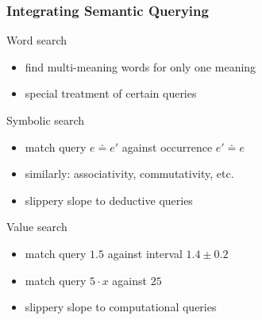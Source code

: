 \begin{frame}\frametitle{Integrating Semantic Querying}
Word search
\begin{itemize}
\item find multi-meaning words for only one meaning 
\item special treatment of certain queries 
\end{itemize}

Symbolic search
\begin{itemize}
\item match query $e\doteq e'$ against occurrence $e'\doteq e$
\item similarly: associativity, commutativity, etc.
\item slippery slope to deductive queries
\end{itemize}

Value search
\begin{itemize}
\item match query $1.5$ against interval $1.4\pm 0.2$
\item match query $5\cdot x$ against $25$
\item slippery slope to computational queries
\end{itemize}
\end{frame}

